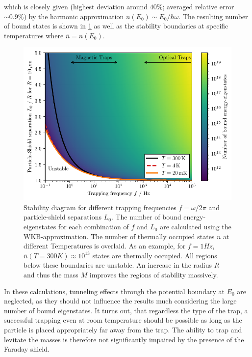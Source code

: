 which is closely given (highest deviation around $40\%$; averaged relative error $\sim 0.9\%$) by the harmonic approximation $n(E_0) \sim E_0 / \hbar \omega$.
The resulting number of bound states is shown in \cref{fig:4:trap-stability} as well as the stability boundaries at specific temperatures where $\bar{n} = n(E_0)$.
\begin{figure}[!htbp]
  \centering
  \includegraphics[width=\textwidth]{./../figures/others/trap-stability-with-R.pdf}
  \caption{Stability diagram for different trapping frequencies $f = \omega/2\pi$ and particle-shield separations $L_0$. The number of bound energy-eigenstates for each combination of $f$ and $L_0$ are calculated using the WKB-approximation. The number of thermally occupied states $\bar{n}$ at different Temperatures is overlaid. As an example, for $f=1\si{Hz}$, $\bar{n}(T=300\si{K})\approx 10^{13}$ states are thermally occupied. All regions below these boundaries are unstable. An increase in the radius $R$ and thus the mass $M$ improves the regions of stability massively.}
  \label{fig:4:trap-stability}
\end{figure}
In these calculations, tunneling effects through the potential boundary at $E_0$ are neglected, as they should not influence the results much considering the large number of bound eigenstates.
It turns out, that regardless the type of the trap, a successful trapping even at room temperature should be possible as long as the particle is placed appropriately far away from the trap.
The ability to trap and levitate the masses is therefore not significantly impaired by the presence of the Faraday shield.